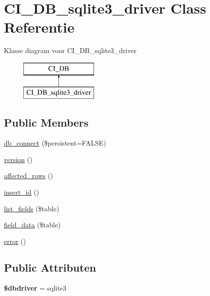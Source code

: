 \hypertarget{class_c_i___d_b__sqlite3__driver}{}\section{C\+I\+\_\+\+D\+B\+\_\+sqlite3\+\_\+driver Class Referentie}
\label{class_c_i___d_b__sqlite3__driver}
Klasse diagram voor C\+I\+\_\+\+D\+B\+\_\+sqlite3\+\_\+driver\begin{figure}[H]
\begin{center}
\leavevmode
\includegraphics[height=2.000000cm]{class_c_i___d_b__sqlite3__driver}
\end{center}
\end{figure}
\subsection*{Public Members}
\begin{DoxyCompactItemize}
\item 
\mbox{\hyperlink{class_c_i___d_b__sqlite3__driver_a52bf595e79e96cc0a7c907a9b45aeb4d}{db\+\_\+connect}} (\$persistent=F\+A\+L\+SE)
\item 
\mbox{\hyperlink{class_c_i___d_b__sqlite3__driver_a6080dae0886626b9a4cedb29240708b1}{version}} ()
\item 
\mbox{\hyperlink{class_c_i___d_b__sqlite3__driver_a77248aaad33eb132c04cc4aa3f4bc8cb}{affected\+\_\+rows}} ()
\item 
\mbox{\hyperlink{class_c_i___d_b__sqlite3__driver_a933f2cde8dc7f87875e257d0a4902e99}{insert\+\_\+id}} ()
\item 
\mbox{\hyperlink{class_c_i___d_b__sqlite3__driver_aef08cd376b16b24608100ca0e3f2f85b}{list\+\_\+fields}} (\$table)
\item 
\mbox{\hyperlink{class_c_i___d_b__sqlite3__driver_a90355121e1ed009e0efdbd544ab56efa}{field\+\_\+data}} (\$table)
\item 
\mbox{\hyperlink{class_c_i___d_b__sqlite3__driver_a43b8d30b879d4f09ceb059b02af2bc02}{error}} ()
\end{DoxyCompactItemize}
\subsection*{Public Attributen}
\begin{DoxyCompactItemize}
\item 
\mbox{\label{class_c_i___d_b__sqlite3__driver_a0cde2a16322a023d040aa7f725877597}} 
{\bfseries \$dbdriver} = \textquotesingle{}sqlite3\textquotesingle{}
\end{DoxyCompactItemize}

